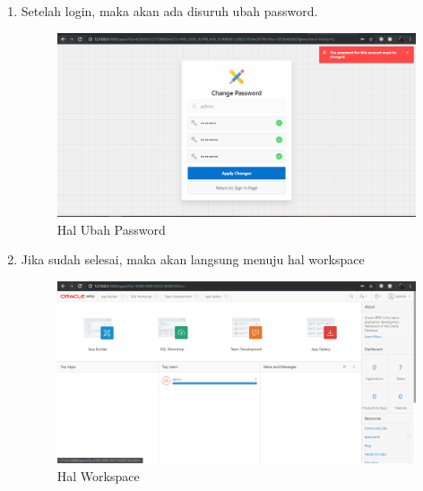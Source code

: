 \documentclass{article}
\begin{document}
\begin{enumerate}
\begin{figure}[!htbp]
    \end{figure}
    \item Setelah login, maka akan ada disuruh ubah password.
    \begin{figure}[!htbp]
        \centering
        \includegraphics[scale=0.3]{LangkahKedelapan.PNG}
        \caption{Hal Ubah Password}
    \end{figure}
\newpage
    \item Jika sudah selesai, maka akan langsung menuju hal workspace
    \begin{figure}[!htbp]
        \centering
        \includegraphics[scale=0.3]{LangkahTerakhir.PNG}
        \caption{Hal Workspace}
    \end{figure}
\end{enumerate}
\end{document}
